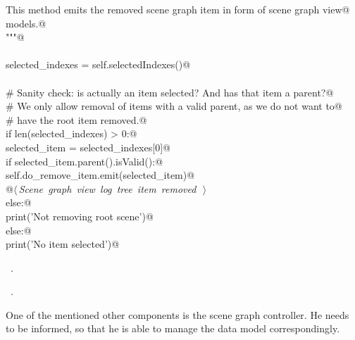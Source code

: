 \documentclass[
    a4paper,      %
    10pt,         %
    openright,    %
    notitlepage,  %
    parskip=half, %
]{scrreprt}       %
\theoremstyle{definition}                    %
\begin{document}
\begin{flushleft}
\begin{minipage}{\linewidth}
\begin{list}{}{}
\mbox{}\lstinline@    This method emits the removed scene graph item in form of scene graph view@\\
\mbox{}\lstinline@    models.@\\
\mbox{}\lstinline@    """@\\
\mbox{}\lstinline@@\\
\mbox{}\lstinline@    selected_indexes = self.selectedIndexes()@\\
\mbox{}\lstinline@@\\
\mbox{}\lstinline@    # Sanity check: is actually an item selected? And has that item a parent?@\\
\mbox{}\lstinline@    # We only allow removal of items with a valid parent, as we do not want to@\\
\mbox{}\lstinline@    # have the root item removed.@\\
\mbox{}\lstinline@    if len(selected_indexes) > 0:@\\
\mbox{}\lstinline@        selected_item = selected_indexes[0]@\\
\mbox{}\lstinline@        if selected_item.parent().isValid():@\\
\mbox{}\lstinline@            self.do_remove_item.emit(selected_item)@\\
\mbox{}\lstinline@            @\hbox{$\langle\,${\itshape Scene graph view log tree item removed}\nobreak\ {\footnotesize {}}$\,\rangle$}\lstinline@@\\
\mbox{}\lstinline@        else:@\\
\mbox{}\lstinline@            print('Not removing root scene')@\\
\mbox{}\lstinline@    else:@\\
\mbox{}\lstinline@        print('No item selected')@\\
\mbox{}\lstinline@@{\NWsep}
\end{list}
\vspace{-1.5ex}
\footnotesize
\begin{list}{}{\setlength{\itemsep}{-\parsep}\setlength{\itemindent}{-\leftmargin}}
\item \NWtxtMacroDefBy\ .
\item \NWtxtMacroRefIn\ .

\item{}
\end{list}
\end{minipage}\vspace{4ex}
\end{flushleft}
One of the mentioned other components is the scene graph controller. He needs to
be informed, so that he is able to manage the data model correspondingly.
\end{document}
